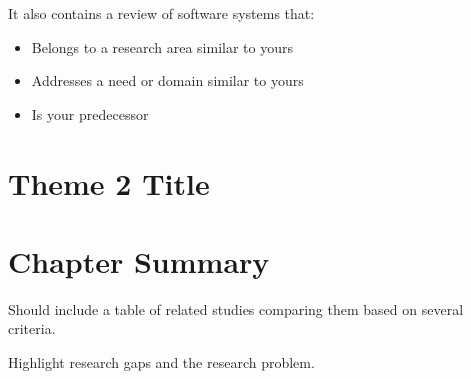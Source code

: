 It also contains a review of software systems that:
%
%
\begin{itemize}
   \item Belongs to a research area similar to yours
   \item Addresses a need or domain similar to yours
   \item Is your predecessor
\end{itemize}

\section{Theme 2 Title}

\section{Chapter Summary}
Should include a table of related studies comparing them based on several criteria.

Highlight research gaps and the research problem.
